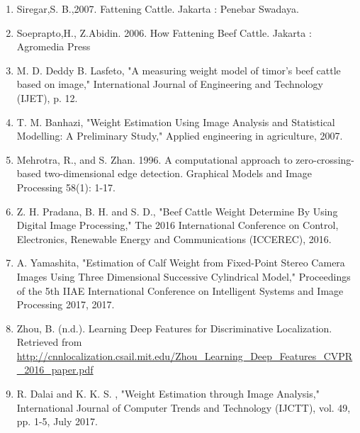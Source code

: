 \begin{enumerate}
	\item Siregar,S. B.,2007. Fattening Cattle. Jakarta : Penebar Swadaya.
	\item Soeprapto,H., Z.Abidin. 2006. How Fattening Beef Cattle. Jakarta : Agromedia Press
	\item  M. D. Deddy B. Lasfeto, "A measuring weight model of timor's beef cattle based on image," International Journal of Engineering and Technology (IJET), p. 12. 
	\item T. M. Banhazi, "Weight Estimation Using Image Analysis and Statistical Modelling: A Preliminary Study," Applied engineering in agriculture, 2007.
	\item Mehrotra, R., and S. Zhan. 1996. A computational approach to zero-crossing-based two-dimensional edge detection. Graphical Models and Image Processing 58(1): 1-17.
	\item Z. H. Pradana, B. H. and S. D., "Beef Cattle Weight Determine By Using Digital Image Processing," The 2016 International Conference on Control, Electronics, Renewable Energy and Communications (ICCEREC), 2016.
	\item A. Yamashita, "Estimation of Calf Weight from Fixed-Point Stereo Camera Images Using Three Dimensional Successive Cylindrical Model," Proceedings of the 5th IIAE International Conference on Intelligent Systems and Image Processing 2017, 2017.
	\item Zhou, B. (n.d.). Learning Deep Features for Discriminative Localization. Retrieved from \url{http://cnnlocalization.csail.mit.edu/Zhou_Learning_Deep_Features_CVPR_2016_paper.pdf}


	\item R. Dalai and K. K. S. , "Weight Estimation through Image Analysis," International Journal of Computer Trends and Technology (IJCTT), vol. 49, pp. 1-5, July 2017.
\end{enumerate}